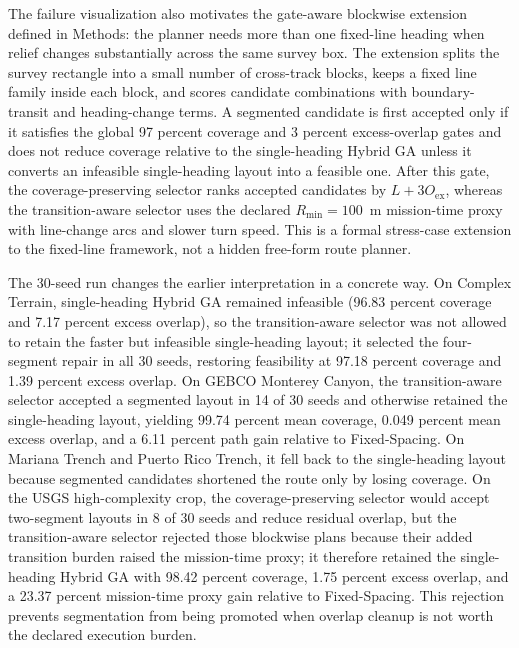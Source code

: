 \documentclass[jmse,article,submit,moreauthors]{Definitions/mdpi}
\begin{document}
The failure visualization also motivates the gate-aware blockwise extension defined in Methods: the planner needs more than one fixed-line heading when relief changes substantially across the same survey box. The extension splits the survey rectangle into a small number of cross-track blocks, keeps a fixed line family inside each block, and scores candidate combinations with boundary-transit and heading-change terms. A segmented candidate is first accepted only if it satisfies the global 97 percent coverage and 3 percent excess-overlap gates and does not reduce coverage relative to the single-heading Hybrid GA unless it converts an infeasible single-heading layout into a feasible one. After this gate, the coverage-preserving selector ranks accepted candidates by \(L+3O_{\mathrm{ex}}\), whereas the transition-aware selector uses the declared \(R_{\min}=100\)~m mission-time proxy with line-change arcs and slower turn speed. This is a formal stress-case extension to the fixed-line framework, not a hidden free-form route planner.

The 30-seed run changes the earlier interpretation in a concrete way. On Complex Terrain, single-heading Hybrid GA remained infeasible (96.83 percent coverage and 7.17 percent excess overlap), so the transition-aware selector was not allowed to retain the faster but infeasible single-heading layout; it selected the four-segment repair in all 30 seeds, restoring feasibility at 97.18 percent coverage and 1.39 percent excess overlap. On GEBCO Monterey Canyon, the transition-aware selector accepted a segmented layout in 14 of 30 seeds and otherwise retained the single-heading layout, yielding 99.74 percent mean coverage, 0.049 percent mean excess overlap, and a 6.11 percent path gain relative to Fixed-Spacing. On Mariana Trench and Puerto Rico Trench, it fell back to the single-heading layout because segmented candidates shortened the route only by losing coverage. On the USGS high-complexity crop, the coverage-preserving selector would accept two-segment layouts in 8 of 30 seeds and reduce residual overlap, but the transition-aware selector rejected those blockwise plans because their added transition burden raised the mission-time proxy; it therefore retained the single-heading Hybrid GA with 98.42 percent coverage, 1.75 percent excess overlap, and a 23.37 percent mission-time proxy gain relative to Fixed-Spacing. This rejection prevents segmentation from being promoted when overlap cleanup is not worth the declared execution burden.
\end{document}
